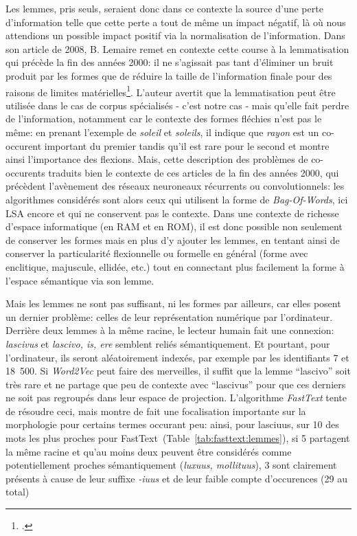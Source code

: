 Les lemmes, pris seuls, seraient donc dans ce contexte la source d'une perte d'information telle que cette perte a tout de même un impact négatif, là où nous attendions un possible impact positif via la normalisation de l'information. Dans son article de 2008, B. Lemaire remet en contexte cette course à la lemmatisation qui précède la fin des années 2000: il ne s'agissait pas tant d'éliminer un bruit produit par les formes que de réduire la taille de l'information finale pour des raisons de limites matérielles\footcite[p. 1]{lemaire_limites_2008}. L'auteur avertit que la lemmatisation peut être utilisée dans le cas de corpus spécialisés - c'est notre cas - mais qu'elle fait perdre de l'information, notamment car le contexte des formes fléchies n'est pas le même: en prenant l'exemple de \textit{soleil} et \textit{soleils}, il indique que \textit{rayon} est un co-occurent important du premier tandis qu'il est rare pour le second et montre ainsi l'importance des flexions. Mais, cette description des problèmes de co-occurents traduits bien le contexte de ces articles de la fin des années 2000, qui précèdent l'avènement des réseaux neuroneaux récurrents ou convolutionnels: les algorithmes considérés sont alors ceux qui utilisent la forme de \textit{Bag-Of-Words}, ici LSA encore et qui ne conservent pas le contexte. Dans une contexte de richesse d'espace informatique (en RAM et en ROM), il est donc possible non seulement de conserver les formes mais en plus d'y ajouter les lemmes, en tentant ainsi de conserver la particularité flexionnelle ou formelle en général (forme avec enclitique, majuscule, ellidée, etc.) tout en connectant plus facilement la forme à l'espace sémantique via son lemme.

Mais les lemmes ne sont pas suffisant, ni les formes par ailleurs, car elles posent un dernier problème: celles de leur représentation numérique par l'ordinateur. Derrière deux lemmes à la même racine, le lecteur humain fait une connexion: \textit{lascivus} et \textit{lascivo, is, ere} semblent reliés sémantiquement. Et pourtant, pour l'ordinateur, ils seront aléatoirement indexés, par exemple par les identifiants 7 et 18~500. Si \textit{Word2Vec} peut faire des merveilles, il suffit que la lemme \enquote{lascivo} soit très rare et ne partage que peu de contexte avec \enquote{lascivus} pour que ces derniers ne soit pas regroupés dans leur espace de projection. L'algorithme \textit{FastText} tente de résoudre ceci, mais montre de fait une focalisation importante sur la morphologie pour certains termes occurant peu: ainsi, pour lasciuus, sur 10 des mots les plus proches pour FastText~(Table~\ref{tab:fasttext:lemmes}), si 5 partagent la même racine et qu'au moins deux peuvent être considérés comme potentiellement proches sémantiquement (\textit{luxuus, mollituus}), 3 sont clairement présents à cause de leur suffixe \textit{-iuus} et de leur faible compte d'occurences (29 au total)


